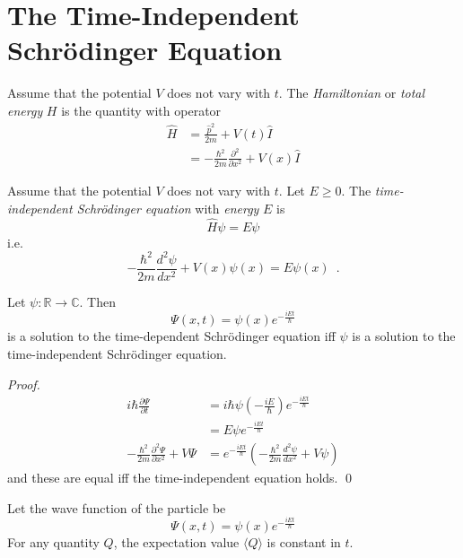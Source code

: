 \section{The Time-Independent Schr\"{o}dinger Equation}

\begin{df}[Hamiltonian]
Assume that the potential $V$ does not vary with $t$. The \emph{Hamiltonian} or \emph{total energy} $H$ is the quantity with operator
\begin{align*}
\hat{H} & = \frac{\hat{p}^2}{2m} + V(t) \hat{I} \\
& = - \frac{\hbar^2}{2m} \frac{\partial^2}{\partial x^2} + V(x) \hat{I}
\end{align*}
\end{df}

\begin{df}
Assume that the potential $V$ does not vary with $t$. Let $E \geq 0$. The \emph{time-independent Schr\"{o}dinger equation} with \emph{energy} $E$ is
\[ \hat{H} \psi = E \psi \]
i.e.
\[ - \frac{\hbar^2}{2m} \frac{d^2 \psi}{dx^2} + V(x) \psi(x) = E \psi(x) \enspace . \]
\end{df}

\begin{prop}
Let $\psi : \mathbb{R} \rightarrow \mathbb{C}$. Then
\[ \Psi(x,t) = \psi(x) e^{- \frac{iEt}{\hbar}} \]
is a solution to the time-dependent Schr\"{o}dinger equation iff $\psi$ is a solution to the time-independent Schr\"{o}dinger equation.
\end{prop}

\begin{proof}
\pf
\begin{align*}
i \hbar \frac{\partial \Psi}{\partial t} & = i \hbar \psi (-\frac{iE}{\hbar}) e^{-\frac{iEt}{\hbar}} \\
& = E \psi e^{- \frac{iEt}{\hbar}} \\
- \frac{\hbar^2}{2m} \frac{\partial^2 \Psi}{\partial x^2} + V \Psi
& = e^{- \frac{iEt}{\hbar}} \left( - \frac{\hbar^2}{2m} \frac{d^2 \psi}{dx^2} + V \psi \right)
\end{align*}
and these are equal iff the time-independent equation holds. \qed
\end{proof}

\begin{prop}
Let the wave function of the particle be
\[ \Psi(x,t) = \psi(x) e^{- \frac{iEt}{\hbar}} \]
For any quantity $Q$, the expectation value $\langle Q \rangle$ is constant in $t$.
\end{prop}


